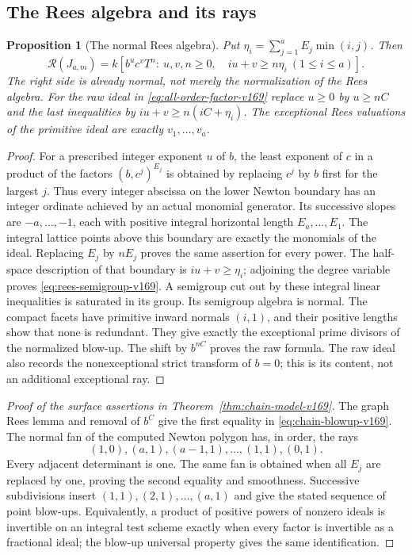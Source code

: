 \documentclass[11pt,reqno]{amsart}
\numberwithin{equation}{section}
\newtheorem{proposition}[theorem]{Proposition}
\theoremstyle{definition}\newtheorem{definition}[theorem]{Definition}
\theoremstyle{remark}\newtheorem{remark}[theorem]{Remark}
\begin{document}
\subsection{The Rees algebra and its rays}
\begin{proposition}[The normal Rees algebra]\label{prop:rees-v169}
Put $\eta_i=\sum_{j=1}^aE_j\min(i,j)$. Then
\begin{equation}\label{eq:rees-semigroup-v169}
 \mathcal R(J_{a,m})=
 k[b^u c^v T^n:\ u,v,n\geq0,\quad
                 iu+v\geq n\eta_i\ (1\leq i\leq a)].
\end{equation}
The right side is already normal, not merely the normalization of the
Rees algebra. For the raw ideal in \eqref{eq:all-order-factor-v169}
replace $u\geq0$ by $u\geq nC$ and the last inequalities by
$iu+v\geq n(iC+\eta_i)$. The exceptional Rees valuations of the
primitive ideal are exactly $v_1,\ldots,v_a$.
\end{proposition}
\begin{proof}
For a prescribed integer exponent $u$ of $b$, the least exponent of
$c$ in a product of the factors $(b,c^j)^{E_j}$ is obtained by replacing
$c^j$ by $b$ first for the largest $j$. Thus every integer abscissa
on the lower Newton boundary has an integer ordinate achieved by an
actual monomial generator. Its successive slopes are $-a,\ldots,-1$,
each with positive integral horizontal length $E_a,\ldots,E_1$.
The integral lattice points above this boundary are exactly the
monomials of the ideal. Replacing $E_j$ by $nE_j$ proves the same
assertion for every power. The half-space description of that boundary
is $iu+v\geq\eta_i$; adjoining the degree variable proves
\eqref{eq:rees-semigroup-v169}. A semigroup cut out by these integral
linear inequalities is saturated in its group. Its semigroup algebra
is normal. The compact facets have primitive inward normals $(i,1)$,
and their positive lengths show that none is redundant. They give
exactly the exceptional prime divisors of the normalized blow-up.
The shift by $b^{nC}$ proves the raw formula. The raw ideal also records
the nonexceptional strict transform of $b=0$; this is its content, not
an additional exceptional ray.
\end{proof}

\begin{proof}[Proof of the surface assertions in Theorem~\ref{thm:chain-model-v169}]
The graph Rees lemma and removal of $b^C$ give the first equality in
\eqref{eq:chain-blowup-v169}. The normal fan of the computed Newton
polygon has, in order, the rays
\[
 (1,0),(a,1),(a-1,1),\ldots,(1,1),(0,1).
\]
Every adjacent determinant is one. The same fan is obtained when all
$E_j$ are replaced by one, proving the second equality and smoothness.
Successive subdivisions insert $(1,1),(2,1),\ldots,(a,1)$ and give
the stated sequence of point blow-ups. Equivalently, a product of
positive powers of nonzero ideals is invertible on an integral test
scheme exactly when every factor is invertible as a fractional ideal;
the blow-up universal property gives the same identification.
\end{proof}
\end{document}
